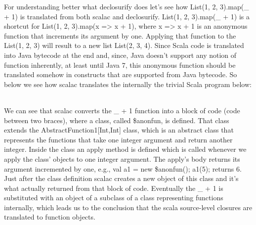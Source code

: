 For understanding better what declosurify does let's see how List(1, 2, 3).map(_
+ 1)  is translated from both scalac and declosurify.
List(1, 2, 3).map(_ + 1) is a shortcut for List(1, 2, 3).map(x => x + 1), where
x => x + 1 is an anonymous function that increments its argument by one.
Applying that function to the List(1, 2, 3) will result to a new list List(2,
3, 4). Since Scala code is translated into Java bytecode at the end and, since,
Java  doesn't support any notion of function inherently, at least until Java 7,
this anonymous function should be translated somehow in constructs that are
supported from Java bytecode. So below we see how scalac translates the
internally the trivial Scala program below:\\
 \\


We can see that scalac converts the _ + 1 function into a block of code (code
between two braces), where a class, called \$anonfun, is defined. That class
extends the AbstractFunction1[Int,Int] class, which is an abstract
class that represents the functions that take one integer argument and return
another integer. Inside the class an apply method is defined which is called
whenever we apply the class' objects to one integer argument. The apply's body
returns  its argument incremented by one,  e.g., val a1 = new \$anonfun();
a1(5); returns 6. Just after the class definition scalac creates a new object
of this class and it's what actually returned from that block of code.
Eventually the _ + 1 is substituted with an object of a subclass of a class
representing functions internally, which leads us to the conclusion that the
scala source-level closures are translated to function objects.

